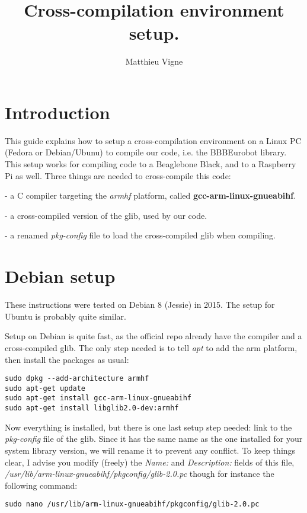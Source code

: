 \documentclass[a4paper,11pt]{article}
\title{Cross-compilation environment setup.}
\author{Matthieu Vigne}
\begin{document}
\maketitle
\tableofcontents
\section{Introduction}

\par This guide explains how to setup a cross-compilation environment on a Linux PC (Fedora or Debian/Ubunu) to compile our code, i.e. the BBBEurobot library. This setup works for compiling code to a Beaglebone Black, and to a Raspberry Pi as well.
Three things are needed to cross-compile this code:

 - a C compiler targeting the \emph{armhf} platform, called \textbf{gcc-arm-linux-gnueabihf}.
 
 - a cross-compiled version of the glib, used by our code.
 
 - a renamed \emph{pkg-config} file to load the cross-compiled glib when compiling.
 
\section{Debian setup}

These instructions were tested on Debian 8 (Jessie) in 2015. The setup for Ubuntu is probably quite similar.

Setup on Debian is quite fast, as the official repo already have the compiler and a cross-compiled glib. The only step needed is to tell \emph{apt} to add the arm platform, then install the packages as usual:

\begin{lstlisting}[]
sudo dpkg --add-architecture armhf
sudo apt-get update
sudo apt-get install gcc-arm-linux-gnueabihf
sudo apt-get install libglib2.0-dev:armhf
\end{lstlisting}

Now everything is installed, but there is one last setup step needed: link to the \emph{pkg-config} file of the glib. Since it has the same name as the one installed for your system library version, we will rename it to prevent any conflict. To keep things clear, I advise you modify (freely) the \emph{Name:} and \emph{Description:} fields of this file, \emph{/usr/lib/arm-linux-gnueabihf/pkgconfig/glib-2.0.pc} though for instance the following command:

\begin{lstlisting}
sudo nano /usr/lib/arm-linux-gnueabihf/pkgconfig/glib-2.0.pc
\end{lstlisting}
\end{document}
